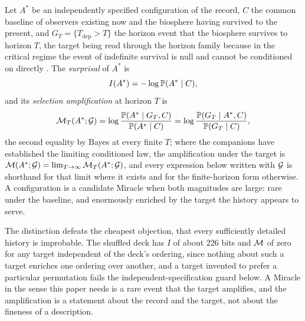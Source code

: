 \begin{definition}\label{def:magnitudes}
Let $A^\ast$ be an independently specified configuration of the record,
$C$ the common baseline of observers existing now and the biosphere
having survived to the present, and $G_T=\{T_{\mathrm{dep}}>T\}$ the
horizon event that the biosphere survives to horizon $T$, the target
being read through the horizon family because in the critical regime
the event of indefinite survival is null and cannot be conditioned on
directly \cite{GoldenSurvivorship,GoldenTargeted}. The \emph{surprisal} of $A^\ast$ is
\[
I(A^\ast)=-\log\mathbb{P}(A^\ast\mid C),
\]
and its \emph{selection amplification} at horizon $T$ is
\[
\mathcal{M}_T(A^\ast;\mathcal{G})=\log\frac{\mathbb{P}(A^\ast\mid G_T,C)}{\mathbb{P}(A^\ast\mid C)}
=\log\frac{\mathbb{P}(G_T\mid A^\ast,C)}{\mathbb{P}(G_T\mid C)},
\]
the second equality by Bayes at every finite $T$; where the companions
have established the limiting conditioned law, the amplification under
the target is $\mathcal{M}(A^\ast;\mathcal{G})=\lim_{T\to\infty}\mathcal{M}_T(A^\ast;\mathcal{G})$, and
every expression below written with $\mathcal{G}$ is shorthand for that limit
where it exists and for the finite-horizon form otherwise. A
configuration is a candidate Miracle when both magnitudes are large:
rare under the baseline, and enormously enriched by the target the
history appears to serve.
\end{definition}

The distinction defeats the cheapest objection, that every sufficiently
detailed history is improbable. The shuffled deck has $I$ of about $226$ bits
and $\mathcal{M}$ of zero for any target independent of the deck's ordering, since
nothing about such a target enriches one ordering over another, and a target
invented to prefer a particular permutation fails the independent-specification
guard below. A Miracle in the sense this paper needs is a rare event that the
target amplifies, and the amplification is a statement about the record and
the target, not about the fineness of a description.

